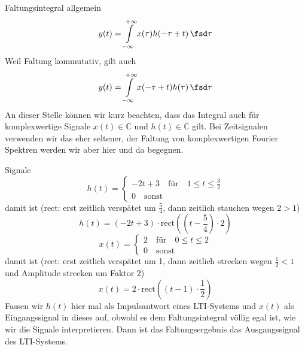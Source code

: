 \begin{Werkzeug}
Faltungsintegral allgemein
\begin{equation}
y(t) = \int\limits_{-\infty}^{+\infty} x(\tau) h(-\tau + t) \, \fsd \tau
\end{equation}
Weil Faltung kommutativ, gilt auch
\begin{equation}
y(t) = \int\limits_{-\infty}^{+\infty} x(-\tau+t) h(\tau) \, \fsd \tau
\end{equation}
An dieser Stelle können wir kurz beachten, dass das Integral auch für
komplexwertige Signale $x(t)\in\mathbb{C}$ und $h(t)\in\mathbb{C}$ gilt. Bei
Zeitsignalen verwenden wir das eher seltener, der Faltung von komplexwertigen
Fourier Spektren werden wir aber hier und da begegnen.
\end{Werkzeug}

\begin{Ansatz}
Signale
\begin{equation}
h(t) =
\begin{cases}
-2 t + 3 \quad \mathrm{für} \quad 1 \leq t \leq \frac{3}{2}\\
0 \quad \mathrm{sonst}
\end{cases}
\end{equation}
damit ist (rect: erst zeitlich verspätet um $\frac{5}{4}$, dann zeitlich
stauchen wegen $2>1$)
\begin{equation}
h(t) = (-2 t + 3) \cdot \mathrm{rect}\left(\left(t-\frac{5}{4}\right) \cdot 2\right)
\end{equation}
\begin{equation}
x(t)=
\begin{cases}
  2 \quad \mathrm{für} \quad 0 \leq t \leq 2\\
  0 \quad \mathrm{sonst}
\end{cases}
\end{equation}
damit ist (rect: erst zeitlich verspätet um 1, dann zeitlich strecken wegen
$\frac{1}{2}<1$ und Amplitude strecken um Faktor 2)
\begin{equation}
x(t) = 2\cdot\mathrm{rect}\left(\left(t-1\right) \cdot \frac{1}{2}\right)
\end{equation}
Fassen wir $h(t)$ hier mal als Impulsantwort eines LTI-Systems und $x(t)$ als
Eingangssignal in dieses auf, obwohl es dem Faltungsintegral völlig egal ist,
wie wir die Signale interpretieren.
%
Dann ist das Faltungsergebnis das Ausgangssignal des LTI-Systems.
\end{Ansatz}



